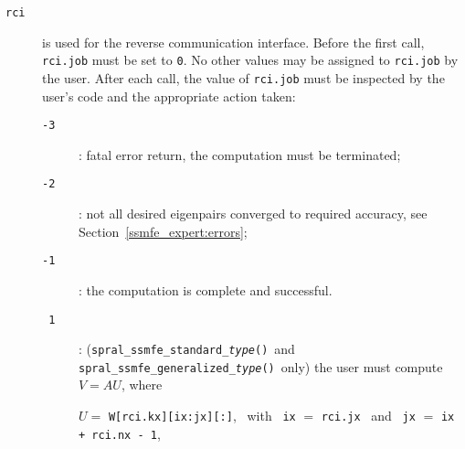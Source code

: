 \begin{description}
%
\item[\texttt{rci}] is used for the reverse communication interface.
Before the first call, {\tt rci.job} must be set to {\tt 0}.
No other values may be assigned to {\tt rci.job} by the user.
After each call,
the value of {\tt rci.job} must be inspected by the user's code
and the appropriate action taken: 
\begin{description}
%
\item[\texttt{-3}]: fatal error return, the computation must be terminated;
%
\item[\texttt{-2}]: 
not all desired eigenpairs converged to required accuracy,
see Section~\ref{ssmfe_expert:errors}; 
%
\item[\texttt{-1}]: the computation is complete and successful.
%
\item[\texttt{~1}]:
({\tt spral\_ssmfe\_standard\_\textit{type}()}\ and {\tt spral\_ssmfe\_generalized\_\textit{type}()}\ only)
the user must compute $V = A U$, where

\hspace{8mm}
$U=$ {\tt W[rci.kx][ix:jx][:]}, 
~with~ {\tt ix} $=$ {\tt rci.jx} 
~and~
{\tt jx} $=$ {\tt ix + rci.nx - 1},


\end{description}
\end{description}
